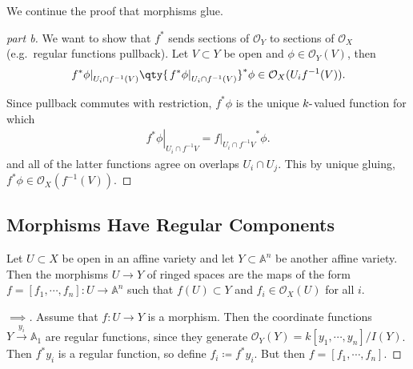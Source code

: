 We continue the proof that morphisms glue.

\begin{proof}[part b]

We want to show that \(f^*\) sends sections of \({\mathcal{O}}_Y\) to
sections of \({\mathcal{O}}_X\) (e.g.~regular functions pullback). Let
\(V\subset Y\) be open and \(\phi \in {\mathcal{O}}_Y(V)\), then
\begin{align*}  
{ \left.{{f^* \phi}} \right|_{{U_i \cap f^{-1} (V)}} }
\qty{ { \left.{{f^* \phi}} \right|_{{U_i \cap f^{-1} (V)}} } }^* \phi \in 
{\mathcal{O}}_X(U_i f^{-1} (V))
.\end{align*}

Since pullback commutes with restriction, \(f^* \phi\) is the unique
\(k{\hbox{-}}\)valued function for which
\begin{align*}  
{ \left.{{f^* \phi}} \right|_{{U_i \cap f^{-1} V}} } =
{ \left.{{f}} \right|_{{U_i\cap f^{-1} V}} }^* \phi
.\end{align*}
and all of the latter functions agree on overlaps \(U_i \cap U_j\). This
by unique gluing, \(f^* \phi \in {\mathcal{O}}_X(f^{-1}(V))\).

\end{proof}

\hypertarget{morphisms-have-regular-components}{%
\subsection{Morphisms Have Regular
Components}\label{morphisms-have-regular-components}}

\begin{proposition}

Let \(U\subset X\) be open in an affine variety and let
\(Y\subset {\mathbb{A}}^n\) be another affine variety. Then the
morphisms \(U\to Y\) of ringed spaces are the maps of the form
\(f = {\left[ {f_1, \cdots, f_n} \right]}: U\to {\mathbb{A}}^n\) such
that \(f(U) \subset Y\) and \(f_i \in {\mathcal{O}}_X(U)\) for all
\(i\).

\end{proposition}

\begin{proof}[$\implies$]

Assume that \(f: U\to Y\) is a morphism. Then the coordinate functions
\(Y\xrightarrow{y_i} {\mathbb{A}}_1\) are regular functions, since they
generate \({\mathcal{O}}_Y(Y) = k[y_1, \cdots, y_n]/I(Y)\). Then
\(f^* y_i\) is a regular function, so define \(f_i \coloneqq f^* y_i\).
But then \(f = {\left[ {f_1, \cdots, f_n} \right]}\).

\end{proof}

